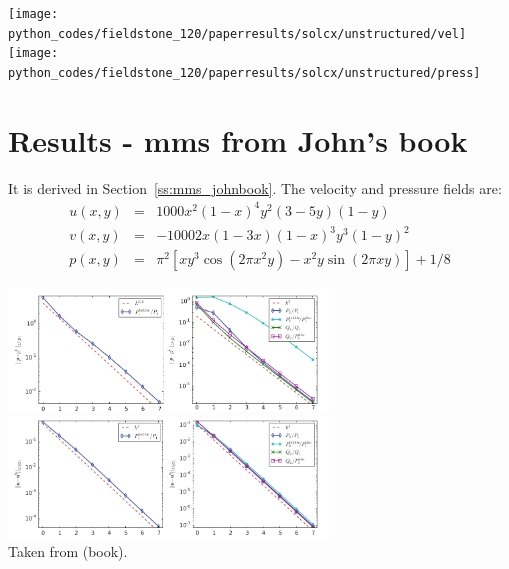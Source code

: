 \texttt{[image: python\_codes/fieldstone\_120/paperresults/solcx/unstructured/vel]}
\texttt{[image: python\_codes/fieldstone\_120/paperresults/solcx/unstructured/press]}
















\newpage
\section*{Results - mms from John's book}

It is derived in Section~\ref{ss:mms_johnbook}. The velocity and pressure fields are:
\begin{eqnarray}
u(x,y) &=& 1000 x^2(1-x)^4  y^2 (3-5y) (1-y) \\
v(x,y) &=& -1000 2x(1-3x) (1-x)^3  y^3(1-y)^2   \\
p(x,y) &=& \pi^2 [xy^3 \cos(2\pi x^2 y) - x^2y \sin(2\pi xy) ]+1/8
\end{eqnarray}



\begin{center} 
\includegraphics[width=8.5cm]{python_codes/fieldstone_120/images/john_a}
\includegraphics[width=8.5cm]{python_codes/fieldstone_120/images/john_b}\\
{\captionfont Taken from \textcite{john16} (book).}
\end{center} 

